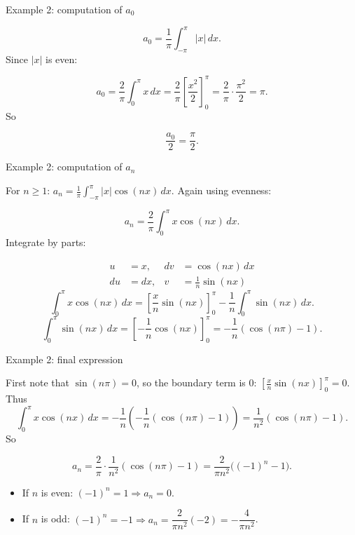 \documentclass[aspectratio=169]{beamer}
\begin{document}
\begin{frame}{Example 2: computation of $a_0$}

\[
a_0 = \frac{1}{\pi}\int_{-\pi}^{\pi} |x|\,dx.
\]
\pause
Since $|x|$ is even:

\[
a_0 = \frac{2}{\pi}\int_{0}^{\pi} x\,dx
    = \frac{2}{\pi}\left[\frac{x^2}{2}\right]_{0}^{\pi}
    = \frac{2}{\pi}\cdot \frac{\pi^2}{2}
    = \pi.
\]
\pause
So

\[
\frac{a_0}{2} = \frac{\pi}{2}.
\]

\end{frame}

\begin{frame}{Example 2: computation of $a_n$}

For $n\ge 1$: $
a_n = \frac{1}{\pi}\int_{-\pi}^{\pi} |x|\cos(nx)\,dx.
$ Again using evenness:

\[
a_n = \frac{2}{\pi}\int_{0}^{\pi} x\cos(nx)\,dx.
\]
\pause
Integrate by parts:

\[
\begin{aligned}
u &= x, & dv &= \cos(nx)\,dx \\
du &= dx, & v &= \frac{1}{n}\sin(nx)
\end{aligned}
\]
\pause
\[
\int_{0}^{\pi} x\cos(nx)\,dx
=
\left[\frac{x}{n}\sin(nx)\right]_{0}^{\pi}
- \frac{1}{n}\int_{0}^{\pi}\sin(nx)\,dx.
\]
\pause
\[
\int_{0}^{\pi}\sin(nx)\,dx
=
\left[-\frac{1}{n}\cos(nx)\right]_{0}^{\pi}
=
-\frac{1}{n}(\cos(n\pi)-1).
\]

\end{frame}

\begin{frame}{Example 2: final expression}

First note that $\sin(n\pi)=0$, so the boundary term is $0$: $
\left[\frac{x}{n}\sin(nx)\right]_{0}^{\pi} = 0
$. Thus
\[
\int_{0}^{\pi} x\cos(nx)\,dx
= -\frac{1}{n}\left(-\frac{1}{n}(\cos(n\pi)-1)\right)
= \frac{1}{n^2}(\cos(n\pi)-1).
\]
\pause
So

\[
a_n = \frac{2}{\pi}\cdot \frac{1}{n^2}(\cos(n\pi)-1)
= \frac{2}{\pi n^2}\big((-1)^n-1\big).
\]

\begin{itemize}
    \item If $n$ is even: $(-1)^n=1 \Rightarrow a_n=0$.
    \item If $n$ is odd: $(-1)^n=-1 \Rightarrow a_n=\dfrac{2}{\pi n^2}(-2)=-\dfrac{4}{\pi n^2}$.
\end{itemize}

\end{frame}
\end{document}
